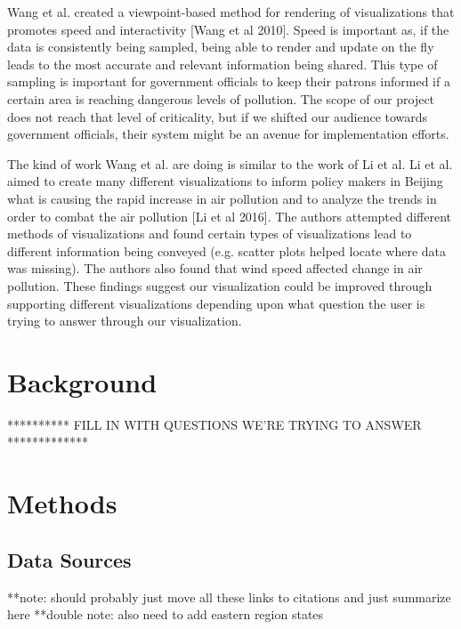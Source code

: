 \documentclass[journal]{vgtc}                %
\begin{document}
Wang et al. created a viewpoint-based method for rendering of visualizations that promotes speed and interactivity [Wang 
et al 2010]. Speed is important as, if the data is consistently being sampled, being able to render and update on the 
fly leads to the most accurate and relevant information being shared. This type of sampling is important for government
officials to keep their patrons informed if a certain area is reaching dangerous levels of pollution. The scope of our
project does not reach that level of criticality, but if we shifted our audience towards government officials, their
system might be an avenue for implementation efforts.

The kind of work Wang et al. are doing is similar to the work of Li et al. Li et al. aimed to create many different
visualizations to inform policy makers in Beijing what is causing the rapid increase in air pollution and to analyze
the trends in order to combat the air pollution [Li et al 2016]. The authors attempted different methods of 
visualizations and found certain types of visualizations lead to different information being conveyed (e.g. scatter
plots helped locate where data was missing). The authors also found that wind speed affected change in air pollution.
These findings suggest our visualization could be improved through supporting different visualizations depending
upon what question the user is trying to answer through our visualization.

\section{Background}
********** FILL IN WITH QUESTIONS WE'RE TRYING TO ANSWER *************

\section{Methods}
\subsection{Data Sources}
**note: should probably just move all these links to citations and just summarize here
**double note: also need to add eastern region states
\end{document}
